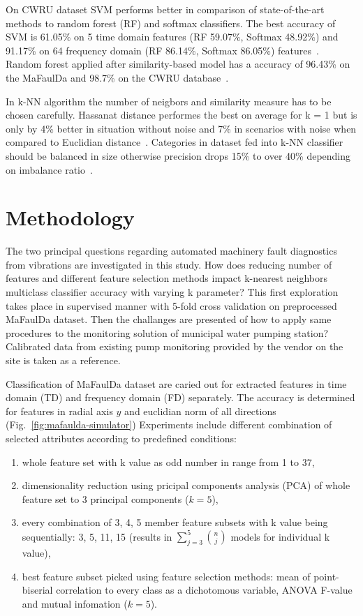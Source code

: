 \documentclass{llncs}
\begin{document}
On CWRU dataset SVM performs better in comparison of state-of-the-art methods to random forest (RF) and softmax classifiers. The best accuracy of SVM is 61.05\% on 5 time domain features (RF 59.07\%, Softmax 48.92\%) and 91.17\% on 64 frequency domain (RF 86.14\%, Softmax 86.05\%) features~\cite{maurya_condition-based_2021}. Random forest applied after similarity-based model has a accuracy of 96.43\% on the MaFaulDa and 98.7\% on the CWRU database~\cite{ribeiro_rotating_2017}.

In k-NN algorithm the number of neigbors and similarity measure has to be chosen carefully. Hassanat distance performes the best on average for k = 1 but is only by 4\% better in situation without noise and 7\% in scenarios with noise when compared to Euclidian distance~\cite{abu_alfeilat_effects_2019}. Categories in dataset fed into k-NN classifier should be balanced in size otherwise precision drops 15\% to over 40\% depending on imbalance ratio~\cite{shi_improving_2020}.

\section{Methodology}
The two principal questions regarding automated machinery fault diagnostics from vibrations are investigated in this study. How does reducing number of features and different feature selection methods impact k-nearest neighbors multiclass classifier accuracy with varying k parameter? This first exploration takes place in supervised manner with 5-fold cross validation on preprocessed MaFaulDa dataset. Then the challanges are presented of how to apply same procedures to the monitoring solution of municipal water pumping station? Calibrated data from existing pump monitoring provided by the vendor on the site is taken as a reference.

Classification of MaFaulDa dataset are caried out for extracted features in time domain (TD) and frequency domain (FD) separately. The accuracy is determined for features in radial axis $y$ and euclidian norm of all directions (Fig.~\ref{fig:mafaulda-simulator})  Experiments include different combination of selected attributes according to predefined conditions:
\begin{enumerate}
\item whole feature set with k value as odd number in range from 1 to 37,
\item dimensionality reduction using pricipal components analysis (PCA) of whole feature set to 3 principal components ($k = 5$),
\item every combination of 3, 4, 5 member feature subsets with k value being sequentially: 3, 5, 11, 15 (results in $\sum_{j = 3}^{5}{n\choose j}$ models for individual k value),
\item best feature subset picked using feature selection methods: mean of point-biserial correlation to every class as a dichotomous variable, ANOVA F-value and mutual infomation ($k = 5$).
\end{enumerate}
\end{document}
